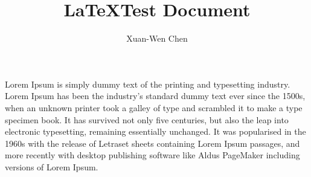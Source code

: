 \documentclass[12pt]{article}
\title{\LaTeX Test Document}
\author{Xuan-Wen Chen}
\begin{document}
\maketitle
Lorem Ipsum is simply dummy text of the printing and typesetting industry. Lorem Ipsum has been the industry's standard dummy text ever since the 1500s, when an unknown printer took a galley of type and scrambled it to make a type specimen book. It has survived not only five centuries, but also the leap into electronic typesetting, remaining essentially unchanged. It was popularised in the 1960s with the release of Letraset sheets containing Lorem Ipsum passages, and more recently with desktop publishing software like Aldus PageMaker including versions of Lorem Ipsum.


\end{document}
